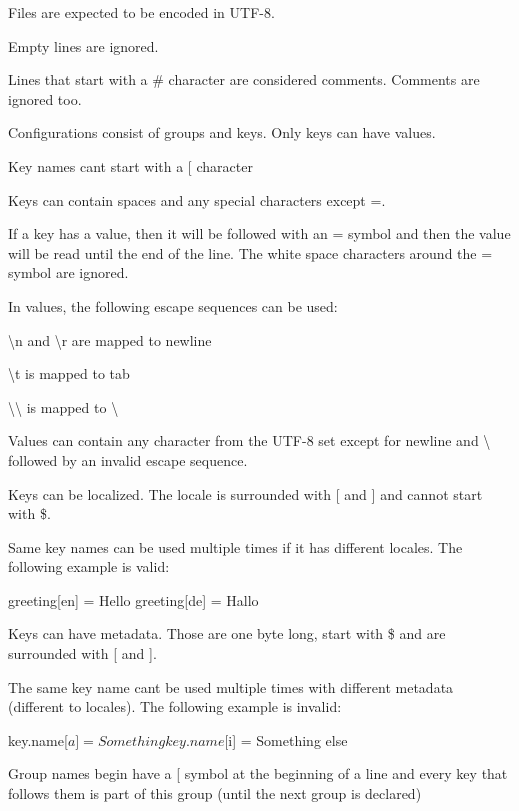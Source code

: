 \begin{DoxyItemize}
\item Files are expected to be encoded in {\ttfamily U\+T\+F-\/8}.
\item Empty lines are ignored.
\item Lines that start with a {\ttfamily \#} character are considered comments. Comments are ignored too.
\item Configurations consist of groups and keys. Only keys can have values.
\item Key names can\textquotesingle{}t start with a {\ttfamily \mbox{[}} character
\item Keys can contain spaces and any special characters except {\ttfamily =}.
\item If a key has a value, then it will be followed with an {\ttfamily =} symbol and then the value will be read until the end of the line. The white space characters around the {\ttfamily =} symbol are ignored.
\item In values, the following escape sequences can be used\+:
\begin{DoxyItemize}
\item {\ttfamily \textbackslash{}n} and {\ttfamily \textbackslash{}r} are mapped to newline
\item {\ttfamily \textbackslash{}t} is mapped to tab
\item {\ttfamily \textbackslash{}\textbackslash{}} is mapped to {\ttfamily \textbackslash{}}
\end{DoxyItemize}
\item Values can contain any character from the {\ttfamily U\+T\+F-\/8} set except for newline and {\ttfamily \textbackslash{}} followed by an invalid escape sequence.
\item Keys can be localized. The locale is surrounded with {\ttfamily \mbox{[}} and {\ttfamily \mbox{]}} and cannot start with {\ttfamily \$}.
\item Same key names can be used multiple times if it has different locales. The following example is valid\+: 
\begin{DoxyCode}
greeting[en] = Hello
greeting[de] = Hallo
\end{DoxyCode}

\item Keys can have metadata. Those are one byte long, start with {\ttfamily \$} and are surrounded with {\ttfamily \mbox{[}} and {\ttfamily \mbox{]}}.
\item The same key name can\textquotesingle{}t be used multiple times with different metadata (different to locales). The following example is invalid\+: 
\begin{DoxyCode}
key.name[$a] = Something
key.name[$i] = Something else
\end{DoxyCode}

\item Group names begin have a {\ttfamily \mbox{[}} symbol at the beginning of a line and every key that follows them is part of this group (until the next group is declared)
\end{DoxyItemize}

